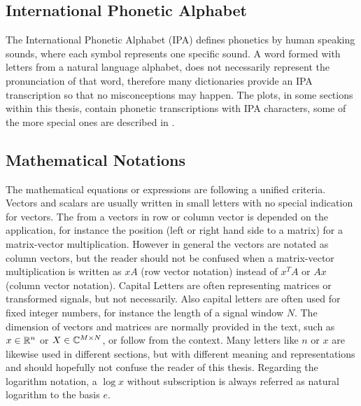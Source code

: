 
\subsection{International Phonetic Alphabet}\label{sec:intro_overview_ipa}
The International Phonetic Alphabet (IPA) defines phonetics by human speaking sounds, where each symbol represents one specific sound.
A word formed with letters from a natural language alphabet, does not necessarily represent the pronunciation of that word, therefore many dictionaries provide an IPA transcription so that no misconceptions may happen.
The plots, in some sections within this thesis, contain phonetic transcriptions with IPA characters, some of the more special ones are described in .



\subsection{Mathematical Notations}\label{sec:intro_overview_math}
The mathematical equations or expressions are following a unified criteria.
Vectors and scalars are usually written in small letters with no special indication for vectors.
The from a vectors in row or column vector is depended on the application, for instance the position (left or right hand side to a matrix) for a matrix-vector multiplication.
However in general the vectors are notated as column vectors, but the reader should not be confused when a matrix-vector multiplication is written as $x A$ (row vector notation) instead of $x^T A$ or $A x$ (column vector notation).
Capital Letters are often representing matrices or transformed signals, but not necessarily.
Also capital letters are often used for fixed integer numbers, for instance the length of a signal window $N$.
The dimension of vectors and matrices are normally provided in the text, such as $x\in\mathbb{R}^n$ or $X\in\mathbb{C}^{M \times N}$, or follow from the context.
Many letters like $n$ or $x$ are likewise used in different sections, but with different meaning and representations and should hopefully not confuse the reader of this thesis.
Regarding the logarithm notation, a $\log x$ without subscription is always referred as natural logarithm to the basis $e$.
